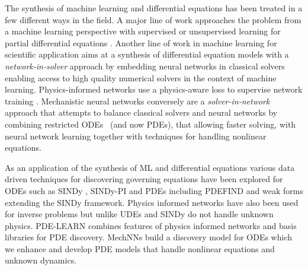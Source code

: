 
The synthesis of machine learning and differential equations has been treated in a few different ways in the field.
A major line of work approaches the problem from a machine learning  perspective with supervised or unsupervised learning for partial differential equations \cite{li2020fourier, brandstetter2022lie}.
Another line of work in machine learning for scientific application aims at a synthesis of differential equation models with a \emph{network-in-solver} approach by embedding neural networks in classical solvers \cite{chen2018neural, rackauckas2020universal} enabling access to high quality numerical solvers in the context of machine learning.
Physics-informed networks use a physics-aware loss to supervise network training \cite{raissi2018deep, raissi2019physics}.
Mechanistic neural networks conversely are a \emph{solver-in-network} approach that attempts to balance classical solvers and neural networks by combining restricted ODEs~\cite{pervezmechanistic,chen2024scalable} (and now PDEs), that allowing faster solving, with neural network learning together with techniques for handling nonlinear equations.

As an application of the synthesis of ML and differential equations various data driven techniques for discovering governing equations have been explored for ODEs such as SINDy \cite{brunton2016discovering}, SINDy-PI \cite{kaheman2020sindy} and PDEs including PDEFIND \cite{rudy2017data} and weak forms \cite{reinbold2020using, messenger2021weak} extending the SINDy framework.
Physics informed networks \cite{raissi2019physics, raissi2018deep} have also been used for inverse problems but unlike UDEs \cite{rackauckas2020universal} and SINDy do not handle unknown physics.
PDE-LEARN \cite{stephany2024pde} combines features of physics informed networks and basis libraries for PDE discovery.
MechNNs \cite{pervezmechanistic} build a discovery model for ODEs  which we enhance and develop PDE models that handle nonlinear equations and unknown dynamics.


